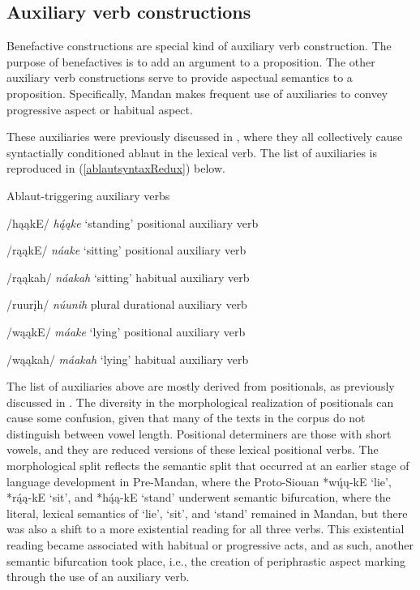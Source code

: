 \subsection{Auxiliary verb constructions}\label{Ch5AuxVerbs}

Benefactive constructions are special kind of auxiliary verb construction. The purpose of benefactives is to add an argument to a proposition. The other auxiliary verb constructions serve to provide aspectual semantics to a proposition. Specifically, Mandan makes frequent use of auxiliaries to convey progressive aspect or habitual aspect.

These auxiliaries were previously discussed in , where they all collectively cause syntactially conditioned ablaut in the lexical verb. The list of auxiliaries is reproduced in (\ref{ablautsyntaxRedux}) below.

\newpage

\begin{exe}
\item\label{ablautsyntaxRedux} Ablaut-triggering auxiliary verbs

\begin{xlist}
\item /hąąkE/ \textit{hą́ąke} `standing' positional auxiliary verb
\item /rąąkE/ \textit{náake} `sitting' positional auxiliary verb
\item /rąąkah/ \textit{náakah} `sitting' habitual auxiliary verb
\item /ruurįh/ \textit{núunih} plural durational auxiliary verb
\item /wąąkE/ \textit{máake} `lying' positional auxiliary verb
\item /wąąkah/ \textit{máakah} `lying' habitual auxiliary verb
\end{xlist}

\end{exe}

The list of auxiliaries above are mostly derived from positionals, as previously discussed in . The diversity in the morphological realization of positionals can cause some confusion, given that many of the texts in the corpus do not distinguish between vowel length. Positional determiners are those with short vowels, and they are reduced versions of these lexical positional verbs. The morphological split reflects the semantic split that occurred at an earlier stage of language development in Pre-Mandan, where the Proto-Siouan *wų́ų-kE `lie', *rą́ą-kE `sit', and *hą́ą-kE `stand' underwent semantic bifurcation, where the literal, lexical semantics of `lie', `sit', and `stand' remained in Mandan, but there was also a shift to a more existential reading for all three verbs. This existential reading became associated with habitual or progressive acts, and as such, another semantic bifurcation took place, i.e., the creation of periphrastic aspect marking through the use of an auxiliary verb.

